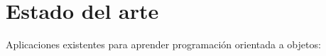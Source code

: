 \chapter{Estado del arte}
Aplicaciones existentes para aprender programación orientada a objetos:



